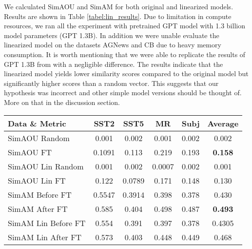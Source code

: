 We calculated SimAOU and SimAM for both original and linearized models. Results are shown in Table \ref{tabel:lin_results}.
Due to limitation in compute resources, we ran all the experiment with pretrained GPT model with 1.3 billion model parameters (GPT 1.3B). In addition we were unable evaluate the linearized model on the datasets AGNews and CB due to heavy memory consumption. It is worth mentioning that we were able to replicate the results of GPT 1.3B from \cite{dai2023gpt} with a negligible difference. 
The results indicate that the linearized model yields lower similarity scores compared to the original model but significantly higher scores than a random vector. This suggests that our hypothesis was incorrect and other simple model versions should be thought of. More on that in the discussion section.
\begin{table*}[t]
    \centering
    \caption{SimAOU and SimAM on four datasets, comparing similarity between random and finetune for both original model and liniarization of the model.}
    \label{tabel:lin_results}
    \begin{tabular}{|l|cccc|c|}
    \hline
    Data \& Metric & SST2 & SST5 & MR & Subj & Average \\ \hline
    SimAOU Random & 0.001 & 0.002 & 0.001 & 0.002 & 0.002\\ 
    SimAOU FT & 0.1091 & 0.113& 0.219& 0.193 & \textbf{0.158} \\ 
    SimAOU Lin Random & 0.001 & 0.002 & 0.0007 & 0.002	& 0.001 \\
    SimAOU Lin FT & 0.122 & 0.0789 &	0.171	& 0.148	& 0.130 \\ \hline
    SimAM Before FT & 0.5547 & 0.3914 & 0.398 & 0.378 & 0.430 \\
    SimAM After FT & 0.585 & 0.404 & 0.498 & 0.487 & \textbf{0.493} \\
    SimAM Lin Before FT & 0.554 & 0.391 &	0.397 & 0.378 & 0.4305 \\
    SimAM Lin After FT & 0.573 & 0.403 & 0.448 & 0.449 & 0.468 \\ \hline
    \end{tabular}
    \end{table*}
    
